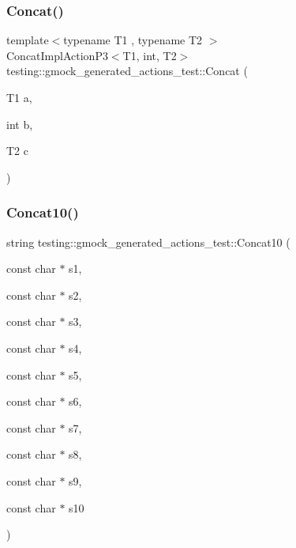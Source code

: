 \mbox{\label{namespacetesting_1_1gmock__generated__actions__test_a861e9fadbecf0c66e8226021c6c22013}} 
\subsubsection{\texorpdfstring{Concat()}{Concat()}\hspace{0.1cm}{\footnotesize\ttfamily [2/2]}}
{\footnotesize\ttfamily template$<$typename T1 , typename T2 $>$ \\
Concat\+Impl\+Action\+P3$<$T1, int, T2$>$ testing\+::gmock\+\_\+generated\+\_\+actions\+\_\+test\+::\+Concat (\begin{DoxyParamCaption}\item[{T1}]{a,  }\item[{int}]{b,  }\item[{T2}]{c }\end{DoxyParamCaption})}

\mbox{\label{namespacetesting_1_1gmock__generated__actions__test_ae90b9884fe6a44fa67c323c4f2f46d4f}} 
\subsubsection{\texorpdfstring{Concat10()}{Concat10()}}
{\footnotesize\ttfamily string testing\+::gmock\+\_\+generated\+\_\+actions\+\_\+test\+::\+Concat10 (\begin{DoxyParamCaption}\item[{const char $\ast$}]{s1,  }\item[{const char $\ast$}]{s2,  }\item[{const char $\ast$}]{s3,  }\item[{const char $\ast$}]{s4,  }\item[{const char $\ast$}]{s5,  }\item[{const char $\ast$}]{s6,  }\item[{const char $\ast$}]{s7,  }\item[{const char $\ast$}]{s8,  }\item[{const char $\ast$}]{s9,  }\item[{const char $\ast$}]{s10 }\end{DoxyParamCaption})}

